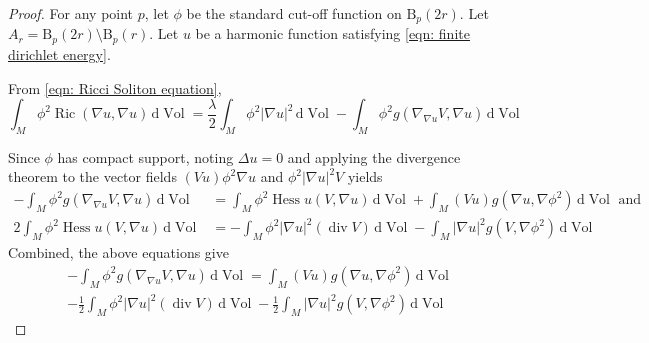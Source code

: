 \documentclass{amsart}
\newcommand{\abs}[1]{\left| #1 \right|}
\newcommand{\derivative}{\mathrm{d}}
\DeclareMathOperator*{\ricci}{Ric}
\DeclareMathOperator*{\divergence}{div}
\DeclareMathOperator*{\hessian}{Hess}
\DeclareMathOperator*{\Vol}{Vol}
\theoremstyle{plain}
\theoremstyle{plain}
\theoremstyle{plain}
\theoremstyle{plain}
\theoremstyle{remark}
\begin{document}
\noHarmonicWithFiniteEnergy*
\begin{proof}
    For any point $p$, let $\phi$ be the standard cut-off function on $\mathrm{B}_p(2r)$.
    Let $A_r = \mathrm{B}_p(2r) \setminus \mathrm{B}_p(r) $.
    Let $u$ be a harmonic function satisfying \cref{eqn: finite dirichlet energy}.

    From \cref{eqn: Ricci Soliton equation},
    \begin{equation}\label{eqn: FDE equation one}
         \int_M \phi^2 \ricci (\nabla u, \nabla u)  \, \derivative{\Vol} 
            = \frac{\lambda}{2} \int_M \phi^2  \abs{\nabla u}^2  \, \derivative{\Vol} 
                - \int_M \phi^2 g (\nabla_{\nabla u} V, \nabla u) \, \derivative{\Vol} 
    \end{equation}
    
    Since $\phi$ has compact support, noting $\Delta u = 0$ and applying the divergence theorem to the vector fields $ (Vu) \phi^2 \nabla u $ and $ \phi^2 \abs{\nabla u}^2 V $ yields 
    \begin{align*}
        -\int_M  \phi^2 g(\nabla_{\nabla u} V, \nabla u )  \, \derivative{\Vol}  
            &= \int_M  \phi^2 \hessian u (V,\nabla u)  \, \derivative{\Vol}
                + \int_M (Vu) g( \nabla u, \nabla \phi^2)  \, \derivative{\Vol}   \text{ and } \\
        2\int_M \phi^2 \hessian u (V,\nabla u) \, \derivative{\Vol}
            &= - \int_M  \phi^2 \abs{\nabla u}^2  (\divergence V) \, \derivative{\Vol} 
                - \int_M \abs{\nabla u}^2 g(V,\nabla \phi^2) \, \derivative{\Vol} 
    \end{align*}
    Combined, the above equations give
    \begin{multline}\label{eqn: FDE equation two}
        -\int_M  \phi^2 g(\nabla_{\nabla u} V, \nabla u )  \, \derivative{\Vol}  
            = \int_M (Vu) g( \nabla u, \nabla \phi^2)  \, \derivative{\Vol}  \\
                - \frac{1}{2} \int_M  \phi^2 \abs{\nabla u}^2  (\divergence V) \, \derivative{\Vol} 
                - \frac{1}{2} \int_M \abs{\nabla u}^2 g(V,\nabla \phi^2) \, \derivative{\Vol} 
    \end{multline}


\end{proof}
\end{document}
